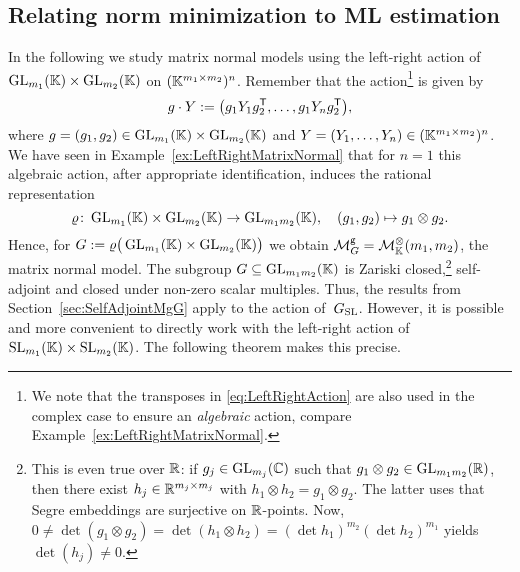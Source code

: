 \subsection{Relating norm minimization to ML estimation}
In the following we study matrix normal models using the left-right action of $\operatorname{GL}_{m_1}(\mathbb K) \times \operatorname{GL}_{m_2}(\mathbb K)$ on $(\mathbb K^{m_1 \times m_2})^n$. Remember that the action\footnote{We note that the transposes in \eqref{eq:LeftRightAction} are also used in the complex case to ensure an \emph{algebraic} action, compare Example~\ref{ex:LeftRightMatrixNormal}.} is given by
	\begin{equation}\label{eq:LeftRightAction}
		g \cdot Y := \big( g_1 Y_1 g_2^{\mathsf{T}}, \ldots, g_1 Y_n g_2^{\mathsf{T}} \big),
	\end{equation}
where $g = (g_1, g_2) \in \operatorname{GL}_{m_1}(\mathbb K) \times \operatorname{GL}_{m_2}(\mathbb K)$ and $Y = (Y_1, \ldots, Y_n) \in (\mathbb K^{m_1 \times m_2})^n$.
We have seen in Example~\ref{ex:LeftRightMatrixNormal} that for $n=1$ this algebraic action, after appropriate identification,
induces the rational  representation
\[\varrho \colon \operatorname{GL}_{m_1}(\mathbb K) \times \operatorname{GL}_{m_2}(\mathbb K) \to \operatorname{GL}_{m_1 m_2}(\mathbb K), \quad
(g_1, g_2) \mapsto g_1 \otimes g_2 .\]
Hence, for $G := \varrho \big( \operatorname{GL}_{m_1}(\mathbb K) \times \operatorname{GL}_{m_2}(\mathbb K) \big)$ we obtain $\mathcal{M}^{\mathtt{g}}_G = \mathcal{M}^{\otimes}_{\mathbb{K}}(m_1, m_2)$, the matrix normal model.
The subgroup $G \subseteq \operatorname{GL}_{m_1 m_2}(\mathbb K)$ is Zariski closed,\footnote{This is even true over $\mathbb R$: if $g_j \in \operatorname{GL}_{m_j}(\mathbb C)$ such that $g_1 \otimes g_2 \in \operatorname{GL}_{m_1 m_2}(\mathbb R)$, then there exist $h_j \in \mathbb R^{m_j \times m_j}$ with $h_1 \otimes h_2 = g_1 \otimes g_2$. The latter uses that Segre embeddings are surjective on $\mathbb R$-points. Now, $0 \neq \det(g_1 \otimes g_2) = \det(h_1 \otimes h_2) = (\det h_1)^{m_2} (\det h_2)^{m_1}$ yields $\det(h_j) \neq 0$.}
self-adjoint and closed under non-zero scalar multiples.
Thus, the results from Section~\ref{sec:SelfAdjointMgG} apply to the action of~$G_{\operatorname{SL}}$.  However, it is possible and more convenient to directly work with the left-right action of $\operatorname{SL}_{m_1}(\mathbb K) \times \operatorname{SL}_{m_2}(\mathbb K)$.
The following theorem makes this precise.

